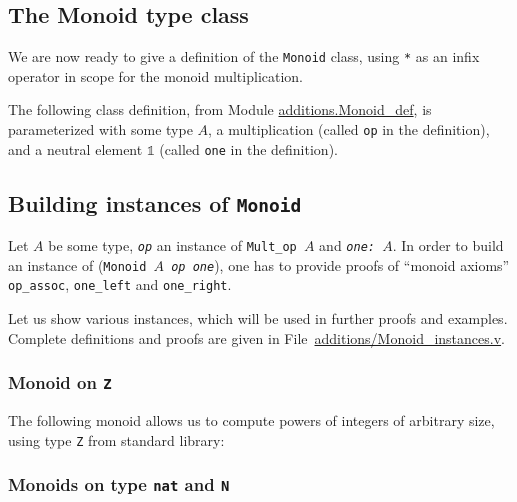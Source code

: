 \subsection{The Monoid type class}
We are now ready to  give a definition of the \texttt{Monoid} class, using
\texttt{*} as an infix operator in scope  for the monoid  multiplication.

The following class definition, from Module \href{../theories/html/additions.Monoid_def.html}{additions.Monoid\_def},
is parameterized with some type $A$,
a multiplication (called \texttt{op} in the definition), and a neutral element
$\mathds{1}$ (called \texttt{one} in the definition).

\label{sect:monoid-def}




\subsection{Building instances of \texttt{Monoid}}
Let \texttt{$A$} be some type, \texttt{{\it op}} an instance of 
\texttt{Mult\_op $A$} and \texttt{\it one: $A$}.
In order to build an instance of (\texttt{Monoid $A$ {\it op} {\it one}}),
one has to provide proofs of ``monoid axioms'' \texttt{ op\_assoc},
\texttt{one\_left} and \texttt{one\_right}.

Let us show various instances, which will be used in further proofs and examples.
Complete definitions and proofs are given in 
File~\href{../theories/html/additions.Monoid_instances.html}{additions/Monoid\_instances.v}.


\subsubsection{Monoid on \texttt{Z}}
The following monoid allows us to compute powers of integers of arbitrary size, 
using type \texttt{Z} from standard library:




\subsubsection{Monoids on type \texttt{nat} and \texttt{N}}
\label{nat-monoids}

